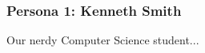 \pagebreak
%
%
%
%

\subsubsection{Persona 1: Kenneth Smith}
Our nerdy Computer Science student...

